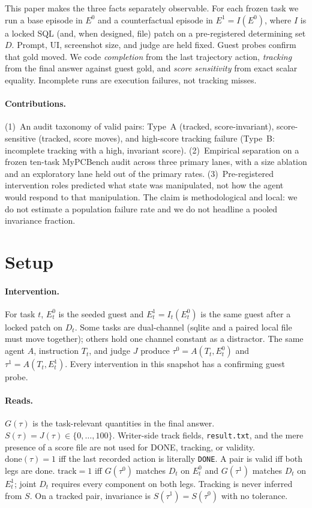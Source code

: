 \documentclass{article}
\begin{document}
This paper makes the three facts separately observable.
For each frozen task we run a base episode in $E^0$ and a counterfactual episode in $E^1=I(E^0)$, where $I$ is a locked SQL (and, when designed, file) patch on a pre-registered determining set $D$.
Prompt, UI, screenshot size, and judge are held fixed.
Guest probes confirm that gold moved.
We code \emph{completion} from the last trajectory action, \emph{tracking} from the final answer against guest gold, and \emph{score sensitivity} from exact scalar equality.
Incomplete runs are execution failures, not tracking misses.

\paragraph{Contributions.}
(1)~An audit taxonomy of valid pairs: Type~A (tracked, score-invariant), score-sensitive (tracked, score moves), and high-score tracking failure (Type~B: incomplete tracking with a high, invariant score).
(2)~Empirical separation on a frozen ten-task MyPCBench audit across three primary lanes, with a size ablation and an exploratory lane held out of the primary rates.
(3)~Pre-registered intervention roles predicted what state was manipulated, not how the agent would respond to that manipulation.
The claim is methodological and local: we do not estimate a population failure rate and we do not headline a pooled invariance fraction.

\section{Setup}
\label{sec:setup}

\paragraph{Intervention.}
For task $t$, $E_t^0$ is the seeded guest and $E_t^1=I_t(E_t^0)$ is the same guest after a locked patch on $D_t$.
Some tasks are dual-channel (sqlite and a paired local file must move together); others hold one channel constant as a distractor.
The same agent $A$, instruction $T_t$, and judge $J$ produce $\tau^0=A(T_t,E_t^0)$ and $\tau^1=A(T_t,E_t^1)$.
Every intervention in this snapshot has a confirming guest probe.

\paragraph{Reads.}
$G(\tau)$ is the task-relevant quantities in the final answer.
$S(\tau)=J(\tau)\in\{0,\dots,100\}$.
Writer-side track fields, \texttt{result.txt}, and the mere presence of a score file are not used for DONE, tracking, or validity.
$\mathrm{done}(\tau)=1$ iff the last recorded action is literally \texttt{DONE}.
A pair is valid iff both legs are done.
$\mathrm{track}=1$ iff $G(\tau^0)$ matches $D_t$ on $E_t^0$ and $G(\tau^1)$ matches $D_t$ on $E_t^1$; joint $D_t$ requires every component on both legs.
Tracking is never inferred from $S$.
On a tracked pair, invariance is $S(\tau^1)=S(\tau^0)$ with no tolerance.
\end{document}
